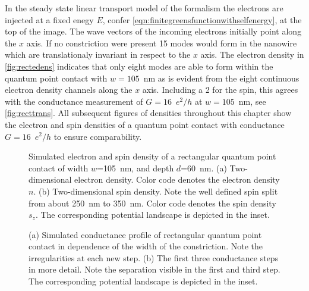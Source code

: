 In the steady state linear transport model of the \gfnc{} formalism the electrons are injected at a fixed enegy $E$, confer \cref{eqn:finitegreensfunctionwithselfenergy}, at the top of the image. The wave vectors of the incoming electrons initially point along the $x$ axis. If no constriction were present 15 modes would form in the nanowire which are translationaly invariant in respect to the $x$ axis. The electron density in \cref{fig:rectedens} indicates that only eight modes are able to form within the quantum point contact with $w=105$~nm as is evident from the eight continuous electron density channels along the $x$ axis. Including a 2 for the spin, this agrees with the conductance measurement of $G=16$~$e^2/h$ at $w=105$~nm, see \cref{fig:recttrans}. All subsequent figures of densities throughout this chapter show the electron and spin densities of a quantum point contact with conductance $G=16$~$e^2/h$ to ensure comparability.\par
\begin{figure}[h]
  \hspace{14pt}
  \hspace{4pt}
  \caption{Simulated electron and spin density of a rectangular quantum point contact of  width $w$=105~nm, and depth $d$=60~nm. (a) Two-dimensional electron density. Color code denotes the electron density $n$. (b) Two-dimensional spin density. Note the well defined spin split from about 250~nm to 350~nm. Color code denotes the spin density $s_z$. The corresponding potential landscape is depicted in the inset.}
\end{figure}
\begin{figure}[h]
  \centering
  \caption{(a) Simulated conductance profile of rectangular quantum point contact in dependence of the width of the constriction. Note the irregularities at each new step. (b) The first three conductance steps in more detail. Note the separation visible in the first and third step. The corresponding potential landscape is depicted in the inset.}
\end{figure}
